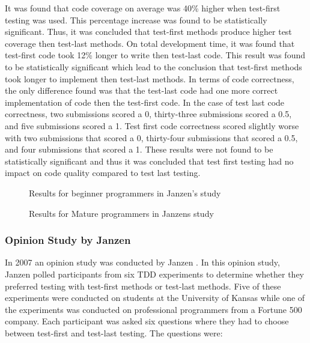 \documentclass{sig-alternate}
\begin{document}
It was found that code coverage on average was 40\% higher when test-first testing was used.  This percentage increase was found to be statistically significant. Thus, it was concluded that test-first methods produce higher test coverage then test-last methods. On total development time, it was found that test-first code took 12\% longer to write then test-last code.  This result was found to be statistically significant which lead to the conclusion that test-first methods took longer to implement then test-last methods. In terms of code correctness, the only difference found was that the test-last code had one more correct implementation of code then the test-first code.  In the case of test last code correctness, two submissions scored a 0, thirty-three submissions scored a 0.5, and five submissions scored a 1.  Test first code correctness scored slightly worse with two submissions that scored a 0, thirty-four submissions that scored a 0.5, and four submissions that scored a 1.  These results were not found to be statistically significant and thus it was concluded that test first testing had no impact on code quality compared to test last testing.

\begin{figure}
\centering
{}
\caption{Results for beginner programmers in Janzen's study}
\end{figure}

\begin{figure}
\centering
{}
\caption{Results for Mature programmers in Janzens study}
\end{figure}

\subsubsection{Opinion Study by Janzen}

In 2007 an opinion study was conducted by Janzen \cite{Janzen:2007}.  In this opinion study, Janzen polled participants from six TDD experiments to determine whether they preferred testing with test-first methods or test-last methods.  Five of these experiments were conducted on students at the University of Kansas while one of the experiments was conducted on professional programmers from a Fortune 500 company.   Each participant was asked six questions where they had to choose between test-first and test-last testing.  The questions were:
\end{document}
